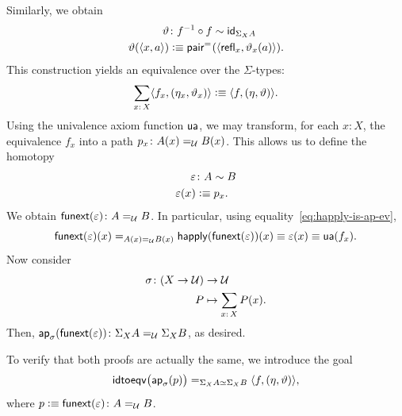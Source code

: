\begin{solution}
\begin{enumerate}[a),font=\upshape]
\begin{enumerate}
            Similarly, we obtain
            \begin{align*}
                \vartheta&\colon f^{-1}\circ f\sim\id_{\Sigma_XA}\\
                \vartheta(\dep{x,a})&\defeq\fun{pair}^{\eq{}}(\dep{\fun{refl}_x,\vartheta_x(a)}).
            \end{align*}
            This construction yields an equivalence over the\/ $\Sigma$-types:
            \begin{equation}\label{eq:eqv-Sigma}
                \sum_{x\colon X}\dep{f_x,(\eta_x,\vartheta_x)}
                    \defeq\dep{f,(\eta,\vartheta)}.
            \end{equation}
            Using the univalence axiom function $\mathsf{ua}$, we may transform, for each $x\colon X$, the equivalence $f_x$ into a path $p_x\colon A(x)\eq\univ B(x)$. This allows us to define the homotopy
            \begin{align*}
                \varepsilon&\colon A\sim B\\
                \varepsilon(x)&\defeq p_x.
            \end{align*}
            We obtain $\fun{funext}(\varepsilon)\colon A\eq\univ B$. In particular, using equality~\eqref{eq:happly-is-ap-ev},
            \[
                \mathsf{funext}(\varepsilon)(x)
                    \mathrel{=_{A(x)\mathrel{=_{\mathcal U}} B(x)}}\mathsf{happly}(\mathsf{funext}(\varepsilon))(x)
                    \equiv\varepsilon(x)
                    \equiv\mathsf{ua}(f_x).
            \]
            Now consider
            \begin{align*}
                \sigma\colon(X\to\univ)&\to\univ\\
                P&\mapsto\sum_{x\colon X}P(x).
            \end{align*}
            Then, $\fun{ap}_\sigma(\fun{funext}(\varepsilon))\colon\Sigma_XA\eq\univ\Sigma_XB$, as desired.
            
            \bigskip

            To verify that both proofs are actually the same, we introduce the goal
            \begin{equation}\label{eq:Sigma-goal}
                \mathsf{idtoeqv}
                    \bigl(
                        \mathsf{ap}_\sigma(p)
                    \bigr)
                \mathrel{=_{\Sigma_XA\simeq\Sigma_XB}}
                \langle f,(\eta,\vartheta)\rangle,
            \end{equation}
            where $p\defeq\fun{funext}(\varepsilon)\colon A\eq\univ B$.
            

\end{enumerate}
\end{enumerate}
\end{solution}
